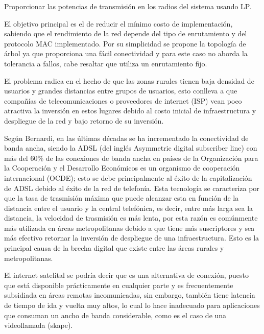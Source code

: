 \documentclass[]{article}
\begin{document}
Proporcionar las potencias de transmisión en los radios del sistema
usando LP.

El objetivo principal es el de reducir el mínimo costo de
implementación, sabiendo que el rendimiento de la red depende del tipo
de enrutamiento y del protocolo MAC implementado. Por su simplicidad se
propone la topología de árbol ya que proporciona una fácil conectividad
y para este caso no aborda la tolerancia a fallos, cabe resaltar que
utiliza un enrutamiento fijo.

El problema radica en el hecho de que las zonas rurales tienen baja
densidad de usuarios y grandes distancias entre grupos de usuarios, esto
conlleva a que compañías de telecomunicaciones o proveedores de internet
(ISP) vean poco atractiva la inversión en estos lugares debido al costo
inicial de infraestructura y despliegue de la red y bajo retorno de su
inversión.

Según Bernardi, en las últimas décadas se ha incrementado la
conectividad de banda ancha, siendo la ADSL (del inglés Asymmetric
digital subscriber line) con más del 60\% de las conexiones de banda
ancha en países de la Organización para la Cooperación y el Desarrollo
Económicos es un organismo de cooperación internacional (OCDE); esto se
debe principalmente al éxito de la capitalización de ADSL debido al
éxito de la red de telefonía. Esta tecnología se caracteriza por que la
tasa de trasmisión máxima que puede alcanzar esta en función de la
distancia entre el usuario y la central telefónica, es decir, entre más
larga sea la distancia, la velocidad de trasmisión es más lenta, por
esta razón es comúnmente más utilizada en áreas metropolitanas debido a
que tiene más suscriptores y sea más efectivo retornar la inversión de
despliegue de una infraestructura. Esto es la principal causa de la
brecha digital que existe entre las áreas rurales y metropolitanas.

El internet satelital se podría decir que es una alternativa de
conexión, puesto que está disponible prácticamente en cualquier parte y
es frecuentemente subsidiada en áreas remotas incomunicadas, sin
embargo, también tiene latencia de tiempo de ida y vuelta muy altos, lo
cual lo hace inadecuado para aplicaciones que consuman un ancho de banda
considerable, como es el caso de una videollamada (skape).
\end{document}
